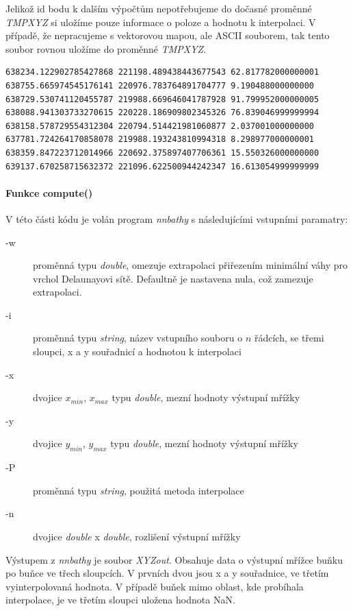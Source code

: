 \documentclass[12pt,a4paper]{article}
\begin{document}
{Jelikož id bodu k dalším výpočtům nepotřebujeme do dočasné proměnné
\emph{TMPXYZ} si uložíme pouze informace o poloze a hodnotu k
interpolaci. V případě, že nepracujeme s vektorovou mapou, ale ASCII
souborem, tak tento soubor rovnou uložíme do proměnné \emph{TMPXYZ}.

\bigskip
\lstset{basicstyle=\footnotesize}
\begin{lstlisting}[caption={Pomocný soubor TMPXYZ}]
638234.122902785427868 221198.489438443677543 62.817782000000001
638755.665974545176141 220976.783764891704777 9.190488000000000
638729.530741120455787 219988.669646041787928 91.799952000000005
638088.941303733270615 220228.186909802345326 76.839046999999994
638158.578729554312304 220794.514421981060877 2.037001000000000
637781.724264170858078 219988.193243810994318 8.298977000000001
638359.847223712014966 220692.375897407706361 15.550326000000000
639137.670258715632372 221096.622500944242347 16.613054999999999
\end{lstlisting}

\bigskip
\paragraph{Funkce compute()}

V této části kódu je volán program \emph{nnbathy} s následujícími
vstupními paramatry:
\begin{description}
\item[-w]{proměnná typu \emph{double}, omezuje extrapolaci přiřezením minimální váhy pro vrchol Delaunayovi sítě. Defaultně je nastavena nula, což zamezuje extrapolaci.}
\item[-i]{proměnná typu \emph{string}, název vstupního souboru o $n$ řádcích, se třemi sloupci, x a y souřadnicí a hodnotou k interpolaci}
\item[-x]{dvojice $x_{min}$, $x_{max}$ typu \emph{double}, mezní hodnoty výstupní mřížky}
\item[-y]{dvojice $y_{min}$, $y_{max}$ typu \emph{double}, mezní hodnoty výstupní mřížky}
\item[-P]{proměnná typu \emph{string}, použitá metoda interpolace}
\item[-n]{dvojice \emph{double} x \emph{double}, rozlišení výstupní mřížky}
\end{description}

Výstupem z \emph{nnbathy} je soubor \emph{XYZout}. Obsahuje data o
výstupní mřížce buňku po buňce ve třech sloupcích. V prvních dvou jsou
x a y souřadnice, ve třetím vyinterpolovaná hodnota. V případě buňek
mimo oblast, kde probíhala interpolace, je ve třetím sloupci uložena
hodnota NaN.

}
\end{document}
